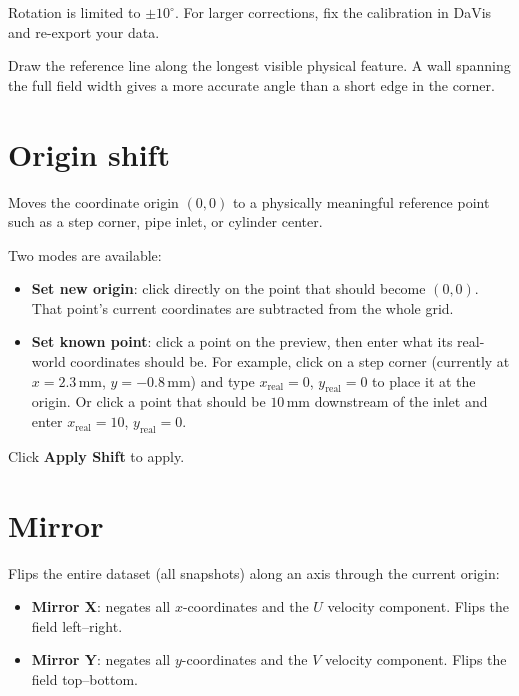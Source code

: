 \documentclass[11pt, a4paper]{report}
\newcommand{\uipth}[1]{\textbf{\textcolor{upblue}{#1}}}
\begin{document}
\begin{notebox}
Rotation is limited to $\pm10^\circ$. For larger corrections, fix the calibration in DaVis and re-export your data.
\end{notebox}

\begin{tipbox}
Draw the reference line along the longest visible physical feature. A wall spanning the full field width gives a more accurate angle than a short edge in the corner.
\end{tipbox}

\section{Origin shift}

Moves the coordinate origin $(0, 0)$ to a physically meaningful reference point such as a step corner, pipe inlet, or cylinder center.

Two modes are available:

\begin{itemize}[leftmargin=1.5em]
  \item \textbf{Set new origin}: click directly on the point that should become $(0, 0)$. That point's current coordinates are subtracted from the whole grid.
  \item \textbf{Set known point}: click a point on the preview, then enter what its real-world coordinates should be. For example, click on a step corner (currently at $x = 2.3$\,mm, $y = -0.8$\,mm) and type \mbox{$x_\mathrm{real} = 0$}, $y_\mathrm{real} = 0$ to place it at the origin. Or click a point that should be $10$\,mm downstream of the inlet and enter $x_\mathrm{real} = 10$, $y_\mathrm{real} = 0$.
\end{itemize}

Click \uipth{Apply Shift} to apply.

\section{Mirror}

Flips the entire dataset (all snapshots) along an axis through the current origin:

\begin{itemize}[leftmargin=1.5em]
  \item \uipth{Mirror X}: negates all $x$-coordinates and the $U$ velocity component. Flips the field left--right.
  \item \uipth{Mirror Y}: negates all $y$-coordinates and the $V$ velocity component. Flips the field top--bottom.
\end{itemize}
\end{document}

